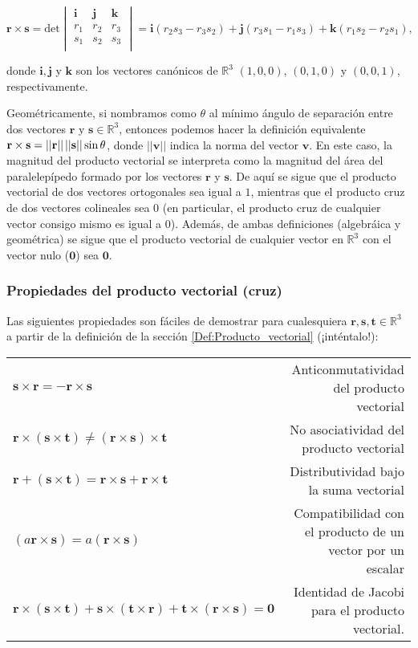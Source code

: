 \documentclass[12pt]{article}
\begin{document}
$$\mathbf{r}\times\mathbf{s} = \text{det} \begin{vmatrix} \mathbf{i}&\mathbf{j}&\mathbf{k} \\ r_1&r_2&r_3 \\ s_1&s_2&s_3 \\
\end{vmatrix} = \mathbf{i}(r_2s_3-r_3s_2)+\mathbf{j}(r_3s_1-r_1s_3)+\mathbf{k}(r_1s_2-r_2s_1),$$

\noindent donde $\mathbf{i},\mathbf{j}$ y $\mathbf{k}$ son los vectores canónicos de $\mathbb{R}^3$ $(1,0,0)$, $(0,1,0)$ y $(0,0,1)$, respectivamente.

Geométricamente, si nombramos como $\theta$ al mínimo ángulo de separación entre dos vectores $\mathbf{r}$ y $\mathbf{s}\in\mathbb{R}^3$, entonces podemos hacer la definición equivalente $\mathbf{r}\times\mathbf{s}=||\mathbf{r}|| \hspace{0.5mm}  ||\mathbf{s}||\sin\theta$, donde $||\mathbf{v}||$ indica la norma del vector $\mathbf{v}$. En este caso, la magnitud del producto vectorial se interpreta como la magnitud del área del paralelepípedo formado por los vectores $\mathbf{r}$ y $\mathbf{s}$. De aquí se sigue que el producto vectorial de dos vectores ortogonales sea igual a $1$, mientras que el producto cruz de dos vectores colineales sea $0$ (en particular, el producto cruz de cualquier vector consigo mismo es igual a $0$). Además, de ambas definiciones (algebráica y geométrica) se sigue que el producto vectorial de cualquier vector en $\mathbb{R}^3$ con el vector nulo ($\mathbf{0}$) sea $\mathbf{0}$.

\subsubsection{Propiedades del producto vectorial (cruz)} \label{Prop:Producto_vectorial}

Las siguientes propiedades son fáciles de demostrar para cualesquiera $\mathbf{r},\mathbf{s},\mathbf{t}\in\mathbb{R}^3$ a partir de la definición de la sección \ref{Def:Producto_vectorial} (¡inténtalo!):

\begin{center}
\begin{tabular}{lr}
    $\mathbf{s}\times\mathbf{r} = -\mathbf{r}\times\mathbf{s}$ & Anticonmutatividad del producto vectorial \\
    $\mathbf{r}\times(\mathbf{s}\times\mathbf{t})\neq(\mathbf{r}\times\mathbf{s})\times\mathbf{t}$ & No asociatividad del producto vectorial \\
    $\mathbf{r}+(\mathbf{s}\times\mathbf{t}) = \mathbf{r}\times\mathbf{s}+\mathbf{r}\times\mathbf{t}$ & Distributividad bajo la suma vectorial \\
    $(a\mathbf{r}\times\mathbf{s}) = a(\mathbf{r}\times\mathbf{s})$ & Compatibilidad con el producto de un vector por un escalar\\
    $\mathbf{r}\times(\mathbf{s}\times\mathbf{t})+\mathbf{s}\times(\mathbf{t}\times\mathbf{r})+\mathbf{t}\times(\mathbf{r}\times\mathbf{s}) = \mathbf{0}$ & Identidad de Jacobi para el producto vectorial.
\end{tabular}
\end{center}
\end{document}
